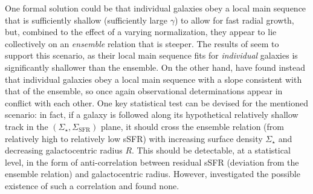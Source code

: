 \documentclass[fleqn,usenatbib]{mnras}
\begin{document}
One formal solution could be that individual galaxies obey a local main sequence that is sufficiently shallow (sufficiently large $\gamma$) to allow for fast radial growth, but, combined to the effect of a varying normalization, they appear to lie collectively on an \emph{ensemble} relation that is steeper. The results of \cite{Vulcani+19} seem to support this scenario, as their local main sequence fits for \emph{individual} galaxies is significantly shallower than the ensemble. On the other hand, \cite{Enia+20} have found instead that individual galaxies obey a local main sequence with a slope consistent with that of the ensemble, so once again observational determinations appear in conflict with each other. One key statistical test can be devised for the mentioned scenario: in fact, if a galaxy is followed along its hypothetical relatively shallow track in the $(\Sigma_\star, \Sigma_\textrm{SFR})$ plane, it should cross the ensemble relation (from relatively high to relatively low sSFR) with increasing surface density $\Sigma_\star$ and decreasing galactocentric radius $R$. This should be detectable, at a statistical level, in the form of anti-correlation between residual sSFR (deviation from the ensemble relation) and galactocentric radius. However, \cite{Hall+18} investigated the possible existence of such a correlation and found none.
\end{document}
